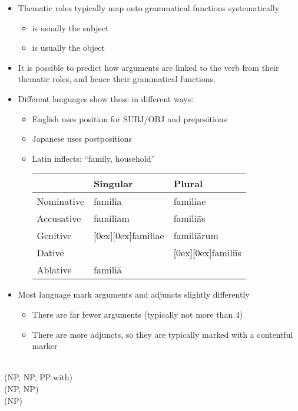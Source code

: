 \documentclass[headrule,footrule]{foils}
\begin{document}
\begin{itemize}
\item    Thematic roles typically map onto grammatical 
  functions systematically
  \begin{itemize}
  \item  {} is usually the subject
  \item  {} is usually the object
  \end{itemize}
\item  It is possible to predict how arguments are linked to 
the verb from their thematic roles, and hence their 
grammatical functions.
\item Different languages show these in different ways:
  \begin{itemize}
  \item English uses position for SUBJ/OBJ and prepositions
  \item Japanese uses postpositions
    \newpage
  \item Latin inflects:   ``family, household''
\\[1ex]    \begin{tabular}{lll}
 & Singular & 	Plural \\ \hline
Nominative & 	familia & 	familiae\\
Accusative & 	familiam & 	familiās\\
Genitive & 	\raisebox{-1ex}[0ex][0ex]{familiae} & 	familiārum\\
Dative &    &		\raisebox{-1ex}[0ex][0ex]{familiīs}  \\
Ablative & 	familiā & 	 \\
    \end{tabular}

  \end{itemize}
\item Most language mark arguments and adjuncts slightly differently
  \begin{itemize}
  \item There are far fewer arguments (typically not more than 4)
  \item There are more adjuncts, so they are typically marked with a
    contentful marker
  \end{itemize}
\end{itemize}

\begin{exe}
  \ex {}
  \\    (NP, NP, PP:with)
  \ex {}
  \\   (NP, NP)
  \ex {}  
  \\  (NP)
\end{exe}
\end{document}
